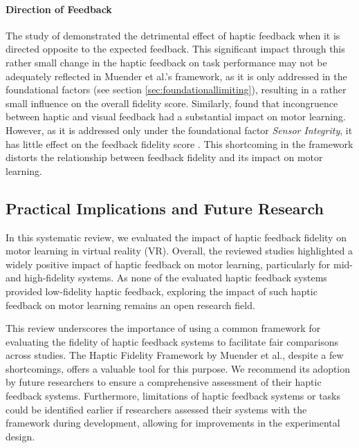\paragraph{Direction of Feedback}
The study of \cite{Macuga2019} demonstrated the detrimental effect of haptic feedback when it is directed opposite to the expected feedback. This significant impact through this rather small change in the haptic feedback on task performance may not be adequately reflected in Muender et al.'s framework, as it is only addressed in the foundational factors (see section \ref{sec:foundationallimiting}), resulting in a rather small influence on the overall fidelity score. Similarly, \cite{Mohanty2023} found that incongruence between haptic and visual feedback had a substantial impact on motor learning. However, as it is addressed only under the foundational factor \textit{Sensor Integrity}, it has little effect on the feedback fidelity score \cite{Muender2022HapticReality}. This shortcoming in the framework distorts the relationship between feedback fidelity and its impact on motor learning.


\subsection{Practical Implications and Future Research}
In this systematic review, we evaluated the impact of haptic feedback fidelity on motor learning in virtual reality (VR). Overall, the reviewed studies highlighted a widely positive impact of haptic feedback on motor learning, particularly for mid- and high-fidelity systems. As none of the evaluated haptic feedback systems provided low-fidelity haptic feedback, exploring the impact of such haptic feedback on motor learning remains an open research field.

This review underscores the importance of using a common framework for evaluating the fidelity of haptic feedback systems to facilitate fair comparisons across studies. The Haptic Fidelity Framework by Muender et al., despite a few shortcomings, offers a valuable tool for this purpose. We recommend its adoption by future researchers to ensure a comprehensive assessment of their haptic feedback systems. Furthermore, limitations of haptic feedback systems or tasks could be identified earlier if researchers assessed their systems with the framework during development, allowing for improvements in the experimental design.

